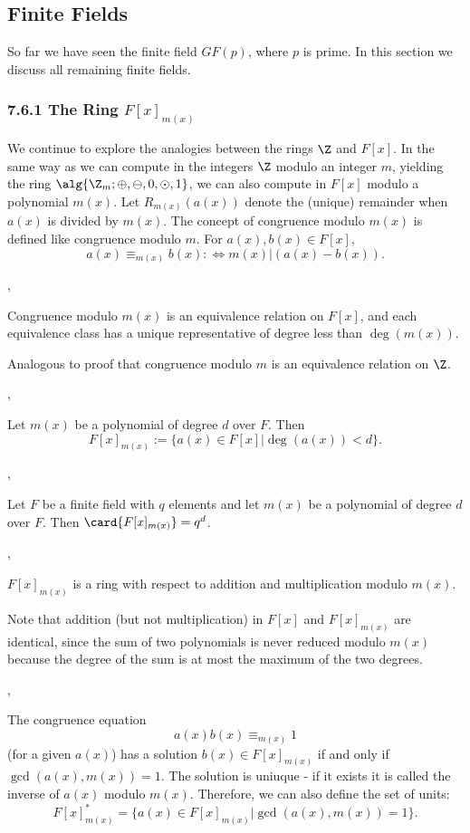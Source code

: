 \subsection{Finite Fields}

So far we have seen the finite field $GF(p)$, where $p$ is prime. In this
section we discuss all remaining finite fields.

\subsubsection*{7.6.1 The Ring $F[x]_{m(x)}$}

We continue to explore the analogies between the rings $\Z$ and $F[x]$. In the
same way as we can compute in the integers $\Z$ modulo an integer $m$, yielding
the ring $\alg{\Z_m;\oplus,\ominus,0,\odot, 1}$, we can also compute in $F[x]$
modulo a polynomial $m(x)$. Let $R_{m(x)}(a(x))$ denote the (unique) remainder
when $a(x)$ is divided by $m(x)$. The concept of congruence modulo $m(x)$ is
defined like congruence modulo $m$. For $a(x),b(x)\in F[x]$,
\[
a(x)\equiv_{m(x)} b(x) :\Longleftrightarrow m(x) | \left(a(x) - b(x)\right).
\]

\sep

 Congruence modulo $m(x)$ is an equivalence relation on $F[x]$, and
each equivalence class has a unique representative of degree less than
$\deg(m(x))$.

\Proof Analogous to proof that congruence modulo $m$ is an equivalence relation
on $\Z$.

\sep

 Let $m(x)$ be a polynomial of degree $d$ over $F$. Then 
\[
F[x]_{m(x)}:=\{a(x)\in F[x] | \deg(a(x)) < d\}.
\]

\sep

 Let $F$ be a finite field with $q$ elements and let $m(x)$ be a
polynomial of degree $d$ over $F$. Then $\card{F[x]_{m(x)}}=q^d$.

\sep

 $F[x]_{m(x)}$ is a ring with respect to addition and multiplication
modulo $m(x)$.

\Com Note that addition (but not multiplication) in $F[x]$ and $F[x]_{m(x)}$ are
identical, since the sum of two polynomials is never reduced modulo $m(x)$
because the degree of the sum is at most the maximum of the two degrees.

\sep

 The congruence equation
\[
a(x)b(x)\equiv_{m(x)}1
\]
(for a given $a(x)$) has a solution $b(x)\in F[x]_{m(x)}$ if and only if
$\gcd(a(x),m(x))=1$. The solution is uniuque - if it exists it is called the
inverse of $a(x)$ modulo $m(x)$. Therefore, we can also define the set of units:
\[
F[x]^*_{m(x)} = \{a(x)\in F[x]_{m(x)} | \gcd(a(x),m(x))=1	\}.
\]

